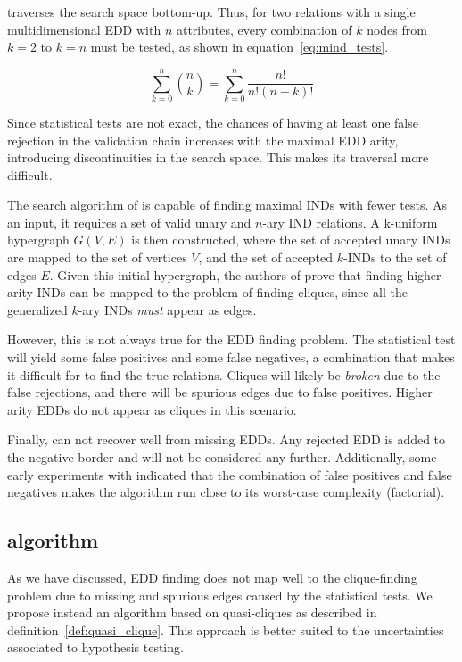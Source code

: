 \Mind traverses the search space bottom-up. Thus, for two relations with a single
multidimensional \gls{EDD} with $n$ attributes, every combination of $k$ nodes from $k = 2$
to $k = n$ must be tested, as shown in equation~\ref{eq:mind_tests}.

\begin{equation}
    \sum_{k=0}^{n}{\binom{n}{k}} = \sum_{k=0}^{n} \frac{n!}{n!(n - k)!}
    \label{eq:mind_tests}
\end{equation}

Since statistical tests are not exact, the chances of having
at least one false rejection in the validation chain
increases with the maximal \gls{EDD} arity, introducing
discontinuities in the search space. This makes its traversal more difficult.

The search algorithm of \Find is capable of finding
maximal \glspl{IND} with fewer tests. As an input, it requires a set of valid unary and $n$-ary
\gls{IND} relations. A k-uniform hypergraph $G(V,E)$ is then constructed, where the set of accepted
unary \glspl{IND} are mapped to the set of vertices $V$, and the set of accepted $k$-INDs to 
the set of edges $E$. 
Given this initial hypergraph, the authors of \Find prove that finding higher arity \glspl{IND} can be
mapped to the problem of finding cliques, since all the generalized $k$-ary \glspl{IND}
\emph{must} appear as edges.

However, this is not always true for the \gls{EDD} finding problem. The statistical test
will yield some false positives and some false negatives, a combination that makes it
difficult for \Find to find the true relations. Cliques will likely be \emph{broken} due
to the false rejections, and there will be spurious edges due to false positives.
Higher arity \glspl{EDD} do not appear as cliques in this scenario.

Finally, \Zigzag can not recover well from missing
\glspl{EDD}. Any rejected \gls{EDD} is added to the negative border
and will not be considered any further. Additionally, some
early experiments with \Zigzag indicated
that the combination of false positives and false negatives
makes the algorithm run close to its worst-case complexity (factorial).

\subsection{\PresQ algorithm}
\label{sec:presq}

As we have discussed, \gls{EDD} finding does not map well to the clique-finding
problem due to missing and spurious edges caused by the statistical tests. We propose instead
an algorithm based on quasi-cliques as described in definition~\ref{def:quasi_clique}.
This approach is better suited to the uncertainties associated to hypothesis testing.

